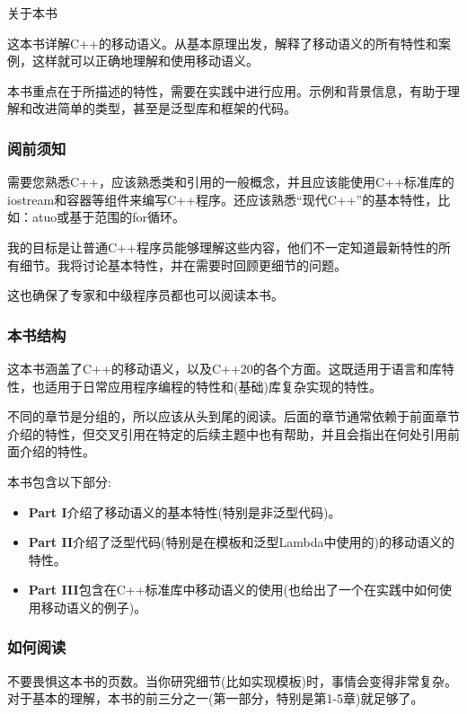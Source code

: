 \begin{flushright}
	 关于本书
\end{flushright}

这本书详解C++的移动语义。从基本原理出发，解释了移动语义的所有特性和案例，这样就可以正确地理解和使用移动语义。

本书重点在于所描述的特性，需要在实践中进行应用。示例和背景信息，有助于理解和改进简单的类型，甚至是泛型库和框架的代码。

\subsubsection{阅前须知}

需要您熟悉C++，应该熟悉类和引用的一般概念，并且应该能使用C++标准库的iostream和容器等组件来编写C++程序。还应该熟悉“现代C++”的基本特性，比如：atuo或基于范围的for循环。

我的目标是让普通C++程序员能够理解这些内容，他们不一定知道最新特性的所有细节。我将讨论基本特性，并在需要时回顾更细节的问题。

这也确保了专家和中级程序员都也可以阅读本书。


\subsubsection{本书结构}

这本书涵盖了C++的移动语义，以及C++20的各个方面。这既适用于语言和库特性，也适用于日常应用程序编程的特性和(基础)库复杂实现的特性。

不同的章节是分组的，所以应该从头到尾的阅读。后面的章节通常依赖于前面章节介绍的特性，但交叉引用在特定的后续主题中也有帮助，并且会指出在何处引用前面介绍的特性。

本书包含以下部分:
\begin{itemize}
	\item \textbf{Part I}介绍了移动语义的基本特性(特别是非泛型代码)。
	\item \textbf{Part II}介绍了泛型代码(特别是在模板和泛型Lambda中使用的)的移动语义的特性。
	\item \textbf{Part III}包含在C++标准库中移动语义的使用(也给出了一个在实践中如何使用移动语义的例子)。
\end{itemize}


\subsubsection{如何阅读}

不要畏惧这本书的页数。当你研究细节(比如实现模板)时，事情会变得非常复杂。对于基本的理解，本书的前三分之一(第一部分，特别是第1-5章)就足够了。

